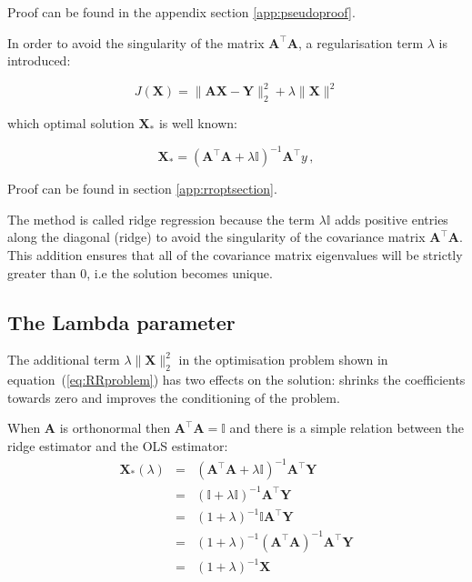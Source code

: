 Proof can be found in the appendix section \ref{app:pseudoproof}.


In order to avoid the singularity of the matrix $\mathbf{A}^\top \mathbf{A}$, a regularisation term $\lambda$ is introduced: 

\begin{equation}
\label{eq:RRproblem} 
J(\mathbf{\mathbf{X}}) =  \| \mathbf{A}\mathbf{\mathbf{X}} - \mathbf{Y} \|_2^2  + \lambda
 \| \mathbf{\mathbf{X}}\| ^2
\end{equation}

\noindent which optimal solution $\mathbf{\mathbf{X}}_*$ is well known: 

\begin{equation}
\label{eq:optsolRR}
\mathbf{\mathbf{X}}_*=(\mathbf{A}^\top \mathbf{A}+\lambda \mathbb{I})^{-1}\mathbf{A}^\top y \, ,
\end{equation}

Proof can be found in section \ref{app:rroptsection}.



The method is called ridge regression because the term $\lambda \mathbb{I}$ adds positive entries along the diagonal (ridge) to avoid the
singularity of the covariance matrix $\mathbf{A}^\top \mathbf{A}$. This addition ensures that all of the covariance matrix eigenvalues will be strictly greater than 0, i.e the solution becomes unique.

\subsection{The Lambda parameter}

The additional term $\lambda \|\mathbf{\mathbf{X}}\|_2^2$ in the optimisation
problem shown in equation~(\ref{eq:RRproblem}) has two effects on the solution:
shrinks the coefficients towards zero and improves the conditioning of the
problem.

When $\mathbf{A}$ is orthonormal then $\mathbf{A}^\top \mathbf{A} =\mathbb{I}$ and there is a simple relation between the ridge estimator and the OLS estimator:
\begin{eqnarray*}
\mathbf{X}_* (\lambda) &=& (\mathbf{A}^\top \mathbf{A}+\lambda \mathbb{I})^{-1}\mathbf{A}^\top \mathbf{Y} \\
 &=& (\mathbb{I} + \lambda \mathbb{I})^{-1} \mathbf{A}^\top \mathbf{Y} \\
 &=&(1+\lambda)^{-1} \mathbb{I} \mathbf{A}^\top \mathbf{Y} \\
 &=&(1+\lambda)^{-1} (\mathbf{A}^\top \mathbf{A})^{-1}\mathbf{A}^\top \mathbf{Y} \\
 &=&(1+\lambda)^{-1} \mathbf{X}
\end{eqnarray*}


